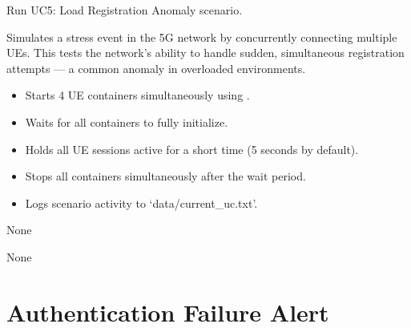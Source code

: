 \documentclass[letterpaper,10pt,english]{sphinxmanual}
\begin{document}
\begin{fulllineitems}
\label{\detokenize{uc5:uc5.run_uc5}}
\pysigstartsignatures
{}
\pysigstopsignatures
\sphinxAtStartPar
Run UC5: Load Registration Anomaly scenario.

\sphinxAtStartPar
Simulates a stress event in the 5G network by concurrently connecting multiple UEs. This tests the network’s ability
to handle sudden, simultaneous registration attempts — a common anomaly in overloaded environments.
\begin{description}
\begin{itemize}
\item {} 
\sphinxAtStartPar
Starts 4 UE containers simultaneously using .

\item {} 
\sphinxAtStartPar
Waits for all containers to fully initialize.

\item {} 
\sphinxAtStartPar
Holds all UE sessions active for a short time (5 seconds by default).

\item {} 
\sphinxAtStartPar
Stops all containers simultaneously after the wait period.

\item {} 
\sphinxAtStartPar
Logs scenario activity to ‘data/current\_uc.txt’.

\end{itemize}

\sphinxAtStartPar
None

\sphinxAtStartPar
None

\end{description}

\end{fulllineitems}


\sphinxstepscope


\chapter{Authentication Failure Alert}
\label{\detokenize{uc6:module-uc6}}\label{\detokenize{uc6:authentication-failure-alert}}\label{\detokenize{uc6::doc}}
\end{document}
